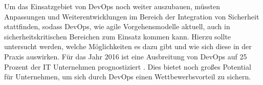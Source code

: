 Um das Einsatzgebiet von DevOps noch weiter auszubauen, müssten Anpassungen und Weiterentwicklungen im Bereich der Integration von Sicherheit stattfinden, sodass DevOps, wie agile Vorgehensmodelle aktuell, auch in sicherheitskritischen Bereichen zum Einsatz kommen kann.
Hierzu sollte untersucht werden, welche Möglichkeiten es dazu gibt und wie sich diese in der Praxis auswirken.
Für das Jahr 2016 ist eine Ausbreitung von DevOps auf 25 Prozent der IT Unternehmen prognostiziert \parencite[vgl.][]{Gartner:2015}. 
Dies bietet noch großes Potential für Unternehmen, um sich durch DevOps einen Wettbewerbsvorteil zu sichern.
